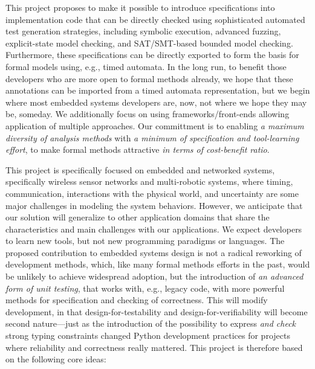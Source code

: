 This project proposes to make it possible to introduce specifications into implementation code that can be directly checked using sophisticated automated test generation strategies, including symbolic execution, advanced fuzzing, explicit-state model checking, and SAT/SMT-based bounded model checking.   Furthermore, these specifications can be directly exported to form the basis for formal models using, e.g., timed automata.  In the long run, to benefit those developers who are more open to formal methods already, we hope that these annotations can be imported from a timed automata representation, but we begin where most embedded systems developers are, now, not where we hope they may be, someday.
We additionally focus on using frameworks/front-ends allowing application of multiple approaches.  Our committment is to enabling \emph{a maximum diversity of analysis methods} with \emph{a minimum of specification and tool-learning effort}, to make formal methods attractive \emph{in terms of cost-benefit ratio}.

This project is specifically focused on embedded and networked systems, specifically wireless sensor networks and multi-robotic systems, where timing, communication, interactions with the physical world, and uncertainty are some major challenges in modeling the system behaviors.
However, we anticipate that our solution will generalize to other application domains that share the characteristics and main challenges with our applications.
We expect developers to learn new tools, but not new programming paradigms or languages.  The proposed contribution to embedded systems design is not a radical reworking of development methods, which, like many formal methods efforts in the past, would be unlikely to achieve widespread adoption, but the introduction of \emph{an advanced form of unit testing}, that works with, e.g., legacy code, with more powerful methods for specification and checking of correctness. This will modify development, in that design-for-testability and design-for-verifiability will become second nature---just as the introduction of the possibility to express \emph{and check} strong typing constraints changed Python development practices for projects where reliability and correctness really mattered.  This project is therefore based on the following core ideas:

